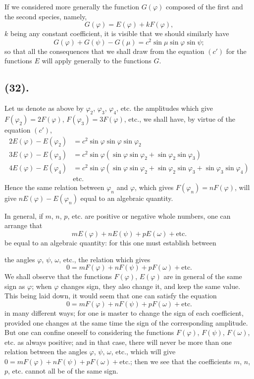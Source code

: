 \documentclass{article}
\begin{document}
If we considered more generally the function $G(\varphi)$ composed of the first and the second species, namely,
\[ G(\varphi)=E(\varphi)+kF(\varphi), \]
$k$ being any constant coefficient, it is visible that we should similarly have
\[ G(\varphi)+G(\psi)-G(\mu)=c^{2}\sin\mu\sin\varphi\sin\psi; \]
so that all the consequences that we shall draw from the equation $(c')$ for the functions $E$ will apply generally to the functions $G$.

\subsection*{(32).}

Let us denote as above by $\varphi_{2}$, $\varphi_{3}$, $\varphi_{4}$, etc. the amplitudes which give $F(\varphi_{2})=2F(\varphi)$, $F(\varphi_{3})=3F(\varphi)$, etc., we shall have, by virtue of the equation $(c')$,
\[ \begin{aligned} 2E(\varphi)-E(\varphi_{2}) &= c^{2}\sin\varphi\sin\varphi\sin\varphi_{2} \\ 3E(\varphi)-E(\varphi_{3}) &= c^{2}\sin\varphi(\sin\varphi\sin\varphi_{2}+\sin\varphi_{2}\sin\varphi_{3}) \\ 4E(\varphi)-E(\varphi_{4}) &= c^{2}\sin\varphi(\sin\varphi\sin\varphi_{2}+\sin\varphi_{2}\sin\varphi_{3}+\sin\varphi_{3}\sin\varphi_{4}) \\ &\text{etc.} \end{aligned} \]
Hence the same relation between $\varphi_{n}$ and $\varphi$, which gives $F(\varphi_{n})=nF(\varphi)$, will give $nE(\varphi)-E(\varphi_{n})$ equal to an algebraic quantity.

In general, if $m$, $n$, $p$, etc. are positive or negative whole numbers, one can arrange that
\[ mE(\varphi)+nE(\psi)+pE(\omega)+\text{etc.} \]
be equal to an algebraic quantity: for this one must establish between

the angles $\varphi$, $\psi$, $\omega$, etc., the relation which gives
\[ 0=mF(\varphi)+nF(\psi)+pF(\omega)+\text{etc.} \]
We shall observe that the functions $F(\varphi)$, $E(\varphi)$ are in general of the same sign as $\varphi$; when $\varphi$ changes sign, they also change it, and keep the same value. This being laid down, it would seem that one can satisfy the equation
\[ 0=mF(\varphi)+nF(\psi)+pF(\omega)+\text{etc.} \]
in many different ways; for one is master to change the sign of each coefficient, provided one changes at the same time the sign of the corresponding amplitude. But one can confine oneself to considering the functions $F(\varphi)$, $F(\psi)$, $F(\omega)$, etc. as always positive; and in that case, there will never be more than one relation between the angles $\varphi$, $\psi$, $\omega$, etc., which will give $0=mF(\varphi)+nF(\psi)+pF(\omega)+\text{etc.}$; then we see that the coefficients $m$, $n$, $p$, etc. cannot all be of the same sign.
\end{document}
